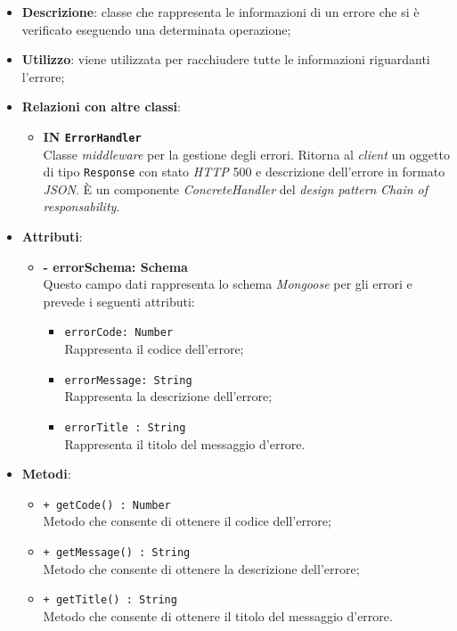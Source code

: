 \begin{itemize}
	\item \textbf{Descrizione}: classe che rappresenta le informazioni di un errore che si è verificato eseguendo una determinata operazione;
	\item \textbf{Utilizzo}: viene utilizzata per racchiudere tutte le informazioni riguardanti l'errore;
	\item \textbf{Relazioni con altre classi}:
		\begin{itemize}
			\item \textbf{IN \texttt{ErrorHandler}} \\
			Classe \textit{middleware} per la gestione degli errori. Ritorna al \textit{client} un oggetto di tipo \texttt{Response} con stato \textit{HTTP} 500 e descrizione dell'errore in formato \textit{JSON}. È un componente \textit{ConcreteHandler} del \textit{design pattern} \textit{Chain of responsability}.
		\end{itemize}
	\item \textbf{Attributi}:
		\begin{itemize}
			\item \textbf{- errorSchema: Schema} \\
			Questo campo dati rappresenta lo schema \textit{Mongoose} per gli errori e prevede i seguenti attributi:
				\begin{itemize}
					\item \texttt{errorCode: Number}\\ Rappresenta il codice dell'errore;
					\item \texttt{errorMessage: String}\\ Rappresenta la descrizione dell'errore; 
					\item \texttt{errorTitle	: String}\\ Rappresenta il titolo del messaggio d'errore.
				\end{itemize}
		\end{itemize}
	\item \textbf{Metodi}:
		\begin{itemize}
			\item \texttt{+ getCode() : Number} \\
			Metodo che consente di ottenere il codice dell'errore;
			\item \texttt{+ getMessage() : String} \\
			Metodo che consente di ottenere la descrizione dell'errore;
			\item \texttt{+ getTitle() : String} \\
			Metodo che consente di ottenere il titolo del messaggio d'errore. 
		\end{itemize}
\end{itemize}
